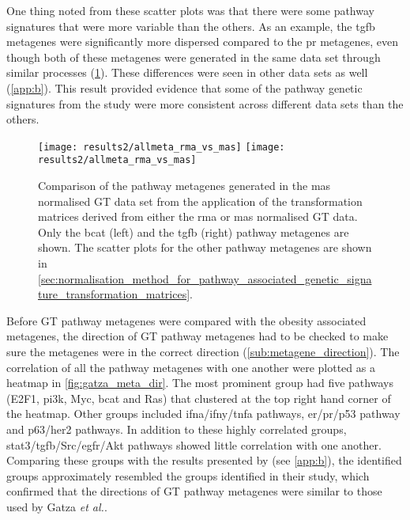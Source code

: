 One thing noted from these scatter plots was that there were some pathway signatures that were more variable than the others.
As an example, the \gls{tgfb} metagenes were significantly more dispersed compared to the \gls{pr} metagenes, even though both of these metagenes were generated in the same data set through similar processes (\cref{fig:gt_rma_vs_mas}).
These differences were seen in other data sets as well (\cref{app:b}).
This result provided evidence that some of the pathway genetic signatures from the \citet{Gatza2010a} study were more consistent across different data sets than the others.
\\

\begin{figure}[htpb]
	\centering
	\texttt{[image: results2/allmeta\_rma\_vs\_mas]}
	\texttt{[image: results2/allmeta\_rma\_vs\_mas]}
	\caption[Comparison of the pathway metagenes generated in the \acrshort{mas} normalised GT data set from the application of the transformation matrices derived from either the \acrshort{rma} or \acrshort{mas} normalised GT data]{Comparison of the pathway metagenes generated in the \acrshort{mas} normalised GT data set from the application of the transformation matrices derived from either the \acrshort{rma} or \acrshort{mas} normalised GT data.
	Only the \gls{bcat} (left) and the \gls{tgfb}  (right) pathway metagenes are shown.
	The scatter plots for the other pathway metagenes are shown in \cref{sec:normalisation_method_for_pathway_associated_genetic_signature_transformation_matrices}.
	}
	\label{fig:gt_rma_vs_mas}
\end{figure}

\noindent
Before GT pathway metagenes were compared with the obesity associated metagenes, the direction of GT pathway metagenes had to be checked to make sure the metagenes were in the correct direction (\cref{sub:metagene_direction}).
The correlation of all the pathway metagenes with one another were plotted as a heatmap in \cref{fig:gatza_meta_dir}.
The most prominent group had five pathways (E2F1, \gls{pi3k}, Myc, \gls{bcat} and Ras) that clustered at the top right hand corner of the heatmap.
Other groups included \gls{ifna}/\gls{ifny}/\gls{tnfa} pathways, \gls{er}/\gls{pr}/p53 pathway and p63/\gls{her2} pathways.
In addition to these highly correlated groups, \gls{stat3}/\gls{tgfb}/Src/\gls{egfr}/Akt pathways showed little correlation with one another.
Comparing these groups with the results presented by \citet{Gatza2010a} (see \cref{app:b}), the identified groups approximately resembled the groups identified in their study, which confirmed that the directions of GT pathway metagenes were similar to those used by Gatza \textit{et al.}.

